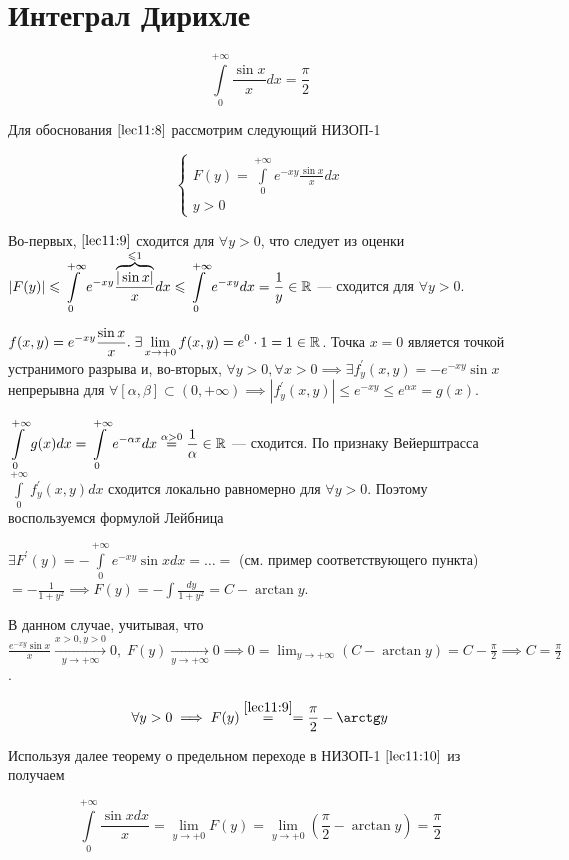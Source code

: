 \documentclass[../../main.tex]{subfiles}
\begin{document}
	\section{Интеграл Дирихле}
	
	\begin{equation}\label{lec11:9}
		\int\limits_0^{+\infty} \frac{\sin x}{x} dx = \frac{\pi}{2}
	\end{equation}	
	
	Для обоснования $\eqref{lec11:8}$ рассмотрим следующий НИЗОП-1
	
	\begin{equation}\label{lec11:10}
		\begin{cases}
			\displaystyle F(y) = \int\limits_0^{+\infty} e^{-xy} \frac{\sin x}{x} dx \\
			y > 0
		\end{cases}
	\end{equation}

	Во-первых, $\eqref{lec11:9}$ сходится для $\forall y > 0$, что следует из 
	оценки $\displaystyle \left|F(y)\right| \leqslant \int\limits_0^{+\infty} e^{-xy} 
	\frac{\overbrace{|\sin x|}^{\leqslant 1}}{x} dx \leqslant \int\limits_0^{+\infty} 
	e^{-xy} dx = \frac{1}{y} \in \mathbb{R}$ --- сходится для $\forall y > 0$. 
	
	$\displaystyle f(x, y) = e^{-xy} \frac{\sin x}{x}. \; \exists \lim_{x 
	\rightarrow +0} f(x, y) = e^0 \cdot 1 = 1 \in \mathbb{R}$. Точка $x = 0$ является 
	точкой устранимого разрыва и, во-вторых, $\displaystyle\forall y > 0, \forall 
	x > 0 \implies \exists f^{'}_y (x, y) = -e^{-xy} \sin x$ непрерывна для 
	$\displaystyle\forall [\alpha, \beta] \subset (0, +\infty) \implies |f^{'}_y 
	(x, y)| \leq e^{-xy} \leq e^{\alpha x} = g(x)$.
	
	$\displaystyle \int\limits_0^{+\infty} g(x) dx = \int\limits_0^{+\infty} 
	e^{-\alpha x} dx \overset{\alpha > 0}{=} \frac{1}{\alpha} \in \mathbb{R}$ --- 
	сходится. По признаку Вейерштрасса $\int\limits_0^{+\infty} f^{'}_y (x, y) 
	dx$ сходится локально равномерно для $\forall y > 0$. Поэтому воспользуемся 
	формулой Лейбница
	
	$\displaystyle \exists F^{'}(y) = - \int\limits_0^{+\infty} e^{-xy} \sin x dx 
	= \ldots = $ (см. пример соответствующего пункта) $\displaystyle = - 
	\frac{1}{1 + y^2} \implies F(y) = - \int \frac{dy}{1 + y^2} = C - \arctan y$.
	
	В данном случае, учитывая, что $\displaystyle\frac{e^{-xy} \sin x}{x} 
	\overset{x > 0, y > 0}{\underset{y \rightarrow +\infty}{\longrightarrow}} 0, 
	\; F(y) \underset{y \rightarrow +\infty}{\longrightarrow} 0 \implies 0 = 
	\lim_{y \rightarrow +\infty} (C - \arctan y) = C - \frac{\pi}{2} \implies C = 
	\frac{\pi}{2}$.

	\begin{equation}\label{lec11:11}
		\forall y > 0 \implies F(y) \overset{\eqref{lec11:9}}{=} = \frac{\pi}{2} - 
		\arctan y
	\end{equation}

	Используя далее теорему о предельном переходе в НИЗОП-1 $\eqref{lec11:10}$ из 
	получаем
	
	\[
	\int\limits_0^{+\infty} \frac{\sin x dx}{x} = \lim_{y \rightarrow +0} F(y) = 
	\lim_{y \rightarrow +0} \left( \frac{\pi}{2} - \arctan y \right) = 
	\frac{\pi}{2}
	\]
\end{document}
